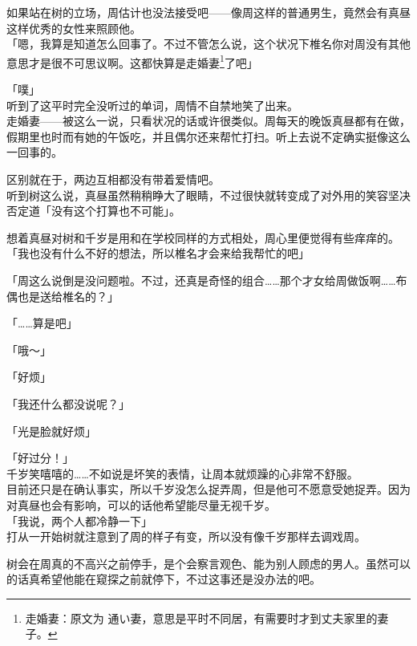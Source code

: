 如果站在树的立场，周估计也没法接受吧——像周这样的普通男生，竟然会有真昼这样优秀的女性来照顾他。\\

「嗯，我算是知道怎么回事了。不过不管怎么说，这个状况下椎名你对周没有其他意思才是很不可思议啊。这都快算是走婚妻\footnote{走婚妻：原文为 {\jpfont 通い妻}，意思是平时不同居，有需要时才到丈夫家里的妻子。}了吧」

「噗」\\

听到了这平时完全没听过的单词，周情不自禁地笑了出来。\\

走婚妻——被这么一说，只看状况的话或许很类似。周每天的晚饭真昼都有在做，假期里也时而有她的午饭吃，并且偶尔还来帮忙打扫。听上去说不定确实挺像这么一回事的。

区别就在于，两边互相都没有带着爱情吧。\\

听到树这么说，真昼虽然稍稍睁大了眼睛，不过很快就转变成了对外用的笑容坚决否定道「没有这个打算也不可能」。

想着真昼对树和千岁是用和在学校同样的方式相处，周心里便觉得有些痒痒的。\\

「我也没有什么不好的想法，所以椎名才会来给我帮忙的吧」

「周这么说倒是没问题啦。不过，还真是奇怪的组合……那个才女给周做饭啊……布偶也是送给椎名的？」

「……算是吧」

「哦～」

「好烦」

「我还什么都没说呢？」

「光是脸就好烦」

「好过分！」\\

千岁笑嘻嘻的……不如说是坏笑的表情，让周本就烦躁的心非常不舒服。\\

目前还只是在确认事实，所以千岁没怎么捉弄周，但是他可不愿意受她捉弄。因为对真昼也会有影响，可以的话他希望能尽量无视千岁。\\

「我说，两个人都冷静一下」\\

打从一开始树就注意到了周的样子有变，所以没有像千岁那样去调戏周。

树会在周真的不高兴之前停手，是个会察言观色、能为别人顾虑的男人。虽然可以的话真希望他能在窥探之前就停下，不过这事还是没办法的吧。\\

